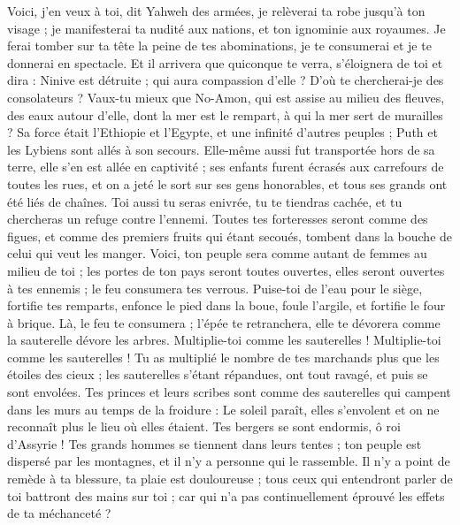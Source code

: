 \begin{multicols}{2}
Voici, j'en veux à toi, dit Yahweh des armées, je relèverai ta robe jusqu'à ton visage ; je manifesterai ta nudité aux nations, et ton ignominie aux royaumes.
Je ferai tomber sur ta tête la peine de tes abominations, je te consumerai et je te donnerai en spectacle.
Et il arrivera que quiconque te verra, s'éloignera de toi et dira : Ninive est détruite ; qui aura compassion d'elle ? D'où te chercherai-je des consolateurs ?
Vaux-tu mieux que No-Amon, qui est assise au milieu des fleuves, des eaux autour d'elle, dont la mer est le rempart, à qui la mer sert de murailles ?
Sa force était l’Ethiopie et l'Egypte, et une infinité d'autres peuples ; Puth et les Lybiens sont allés à son secours.
Elle-même aussi fut transportée hors de sa terre, elle s'en est allée en captivité ; ses enfants furent écrasés aux carrefours de toutes les rues, et on a jeté le sort sur ses gens honorables, et tous ses grands ont été liés de chaînes.
Toi aussi tu seras enivrée, tu te tiendras cachée, et tu chercheras un refuge contre l'ennemi.
Toutes tes forteresses seront comme des figues, et comme des premiers fruits qui étant secoués, tombent dans la bouche de celui qui veut les manger.
Voici, ton peuple sera comme autant de femmes au milieu de toi ; les portes de ton pays seront toutes ouvertes, elles seront ouvertes à tes ennemis ; le feu consumera tes verrous.
Puise-toi de l'eau pour le siège, fortifie tes remparts, enfonce le pied dans la boue, foule l'argile, et fortifie le four à brique.
Là, le feu te consumera ; l'épée te retranchera, elle te dévorera comme la sauterelle dévore les arbres. Multiplie-toi comme les sauterelles ! Multiplie-toi comme les sauterelles !
Tu as multiplié le nombre de tes marchands plus que les étoiles des cieux ; les sauterelles s'étant répandues, ont tout ravagé, et puis se sont envolées.
Tes princes et leurs scribes sont comme des sauterelles qui campent dans les murs au temps de la froidure : Le soleil paraît, elles s’envolent et on ne reconnaît plus le lieu où elles étaient.
Tes bergers se sont endormis, ô roi d'Assyrie ! Tes grands hommes se tiennent dans leurs tentes ; ton peuple est dispersé par les montagnes, et il n'y a personne qui le rassemble.
Il n'y a point de remède à ta blessure, ta plaie est douloureuse ; tous ceux qui entendront parler de toi battront des mains sur toi ; car qui n'a pas continuellement éprouvé les effets de ta méchanceté ?
\PPE{}
\end{multicols}
